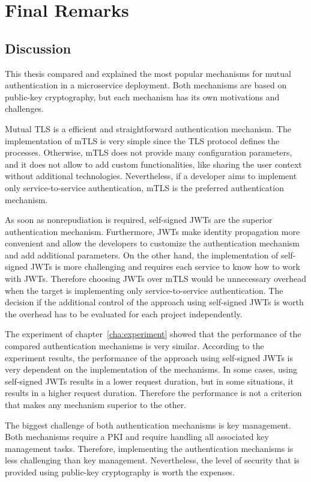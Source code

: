 \chapter{Final Remarks}
\label{cha:final_remarks}

\section{Discussion}
This thesis compared and explained the most popular mechanisms for mutual authentication in a microservice deployment.
Both mechanisms are based on public-key cryptography, but each mechanism has its own motivations and challenges.

Mutual TLS is a efficient and straightforward authentication mechanism.
The implementation of mTLS is very simple since the TLS protocol defines the processes.
Otherwise, mTLS does not provide many configuration parameters, and it does not allow to add custom functionalities, like sharing the user context without additional technologies.
Nevertheless, if a developer aims to implement only service-to-service authentication, mTLS is the preferred authentication mechanism.

As soon as nonrepudiation is required, self-signed JWTs are the superior authentication mechanism.
Furthermore, JWTs make identity propagation more convenient and allow the developers to customize the authentication mechanism and add additional parameters.
On the other hand, the implementation of self-signed JWTs is more challenging and requires each service to know how to work with JWTs.
Therefore choosing JWTs over mTLS would be unnecessary overhead when the target is implementing only service-to-service authentication.
The decision if the additional control of the approach using self-signed JWTs is worth the overhead has to be evaluated for each project independently.

The experiment of chapter~\ref{cha:experiment} showed that the performance of the compared authentication mechanisms is very similar.
According to the experiment results, the performance of the approach using self-signed JWTs is very dependent on the implementation of the mechanisms.
In some cases, using self-signed JWTs results in a lower request duration, but in some situations, it results in a higher request duration.
Therefore the performance is not a criterion that makes any mechanism superior to the other.

The biggest challenge of both authentication mechanisms is key management.
Both mechanisms require a PKI and require handling all associated key management tasks.
Therefore, implementing the authentication mechanisms is less challenging than key management.
Nevertheless, the level of security that is provided using public-key cryptography is worth the expenses.

